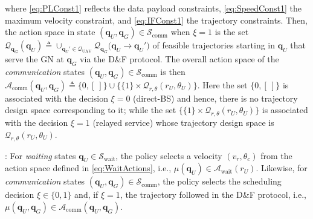 \documentclass[12pt, draftcls, onecolumn]{IEEEtran}
\theoremstyle{plain}
\theoremstyle{definition}
\theoremstyle{remark}
\begin{document}
where \ref{eq:PLConst1} reflects the data payload constraints, \ref{eq:SpeedConst1} the maximum velocity constraint, and \ref{eq:IFConst1} the trajectory constraints. Then, the action space in state $(\mathbf{q}_{U},\mathbf{q}_{G}){\in}\mathcal{S}_{\mathrm{comm}}$ when $\xi{=}1$ is the set $\mathcal{Q}_{\mathbf{q}_{G}}(\mathbf{q}_{U}){\triangleq}\cup_{\mathbf{q}_{U}'{\in}\mathcal{Q}_{\mathrm{UAV}}}\mathcal{Q}_{\mathbf{q}_{G}}\big(\mathbf{q}_{U}{\rightarrow}\mathbf{q}_{U}'\big)$ of feasible trajectories starting in $\mathbf{q}_{U}$ that serve the GN at $\mathbf{q}_{G}$ via the D\&F protocol. The overall action space of the \emph{communication} states $(\mathbf{q}_{U},\mathbf{q}_{G}){\in}\mathcal{S}_{\mathrm{comm}}$ is then $\mathcal{A}_{\mathrm{comm}}(\mathbf{q}_{U},\mathbf{q}_{G}){\triangleq}\{0,[\ ]\}{\cup}\{\{1\}{\times}\mathcal{Q}_{r,\theta}(r_{U},\theta_{U})\}$. Here the set $\{0, [\ ]\}$ is associated with the decision $\xi{=}0$ (direct-BS) and hence, there is no trajectory design space corresponding to it; while the set $\{\{1\}{\times}\mathcal{Q}_{r,\theta}(r_{U},\theta_{U})\}$ is associated with the decision $\xi{=}1$ (relayed service) whose trajectory design space is $\mathcal{Q}_{r,\theta}(r_{U},\theta_{U})$.

: For \emph{waiting} states $\mathbf{q}_{U}{\in}\mathcal{S}_{\mathrm{wait}}$, the policy selects a velocity $(v_{r},\theta_{c})$ from the action space defined in \eqref{eq:WaitActions}, i.e., $\mu(\mathbf{q}_{U}){\in}\mathcal{A}_{\mathrm{wait}}(r_{U})$. Likewise, for \emph{communication} states $(\mathbf{q}_{U},\mathbf{q}_{G}){\in}\mathcal{S}_{\mathrm{comm}}$, the policy selects the scheduling decision $\xi{\in}\{0,1\}$ and, if $\xi{=}1$, the trajectory followed in the D\&F protocol, i.e., $\mu(\mathbf{q}_{U},\mathbf{q}_{G}){\in}\mathcal{A}_{\mathrm{comm}}(\mathbf{q}_{U},\mathbf{q}_{G})$.
\end{document}
